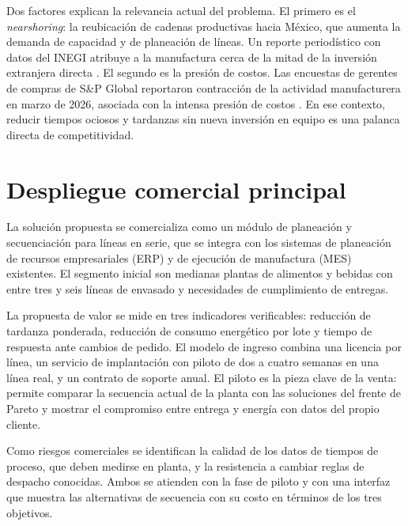 \documentclass[11pt,a4paper]{article}
\begin{document}
Dos factores explican la relevancia actual del problema. El primero es el \emph{nearshoring}: la reubicación de cadenas productivas hacia México, que aumenta la demanda de capacidad y de planeación de líneas. Un reporte periodístico con datos del INEGI atribuye a la manufactura cerca de la mitad de la inversión extranjera directa \cite{mexicoindustry2026ied}. El segundo es la presión de costos. Las encuestas de gerentes de compras de S\&P Global reportaron contracción de la actividad manufacturera en marzo de 2026, asociada con la intensa presión de costos \cite{spglobal2026pmi}. En ese contexto, reducir tiempos ociosos y tardanzas sin nueva inversión en equipo es una palanca directa de competitividad.

\section{Despliegue comercial principal}
La solución propuesta se comercializa como un módulo de planeación y secuenciación para líneas en serie, que se integra con los sistemas de planeación de recursos empresariales (ERP) y de ejecución de manufactura (MES) existentes. El segmento inicial son medianas plantas de alimentos y bebidas con entre tres y seis líneas de envasado y necesidades de cumplimiento de entregas.

La propuesta de valor se mide en tres indicadores verificables: reducción de tardanza ponderada, reducción de consumo energético por lote y tiempo de respuesta ante cambios de pedido. El modelo de ingreso combina una licencia por línea, un servicio de implantación con piloto de dos a cuatro semanas en una línea real, y un contrato de soporte anual. El piloto es la pieza clave de la venta: permite comparar la secuencia actual de la planta con las soluciones del frente de Pareto y mostrar el compromiso entre entrega y energía con datos del propio cliente.

Como riesgos comerciales se identifican la calidad de los datos de tiempos de proceso, que deben medirse en planta, y la resistencia a cambiar reglas de despacho conocidas. Ambos se atienden con la fase de piloto y con una interfaz que muestra las alternativas de secuencia con su costo en términos de los tres objetivos.
\end{document}
